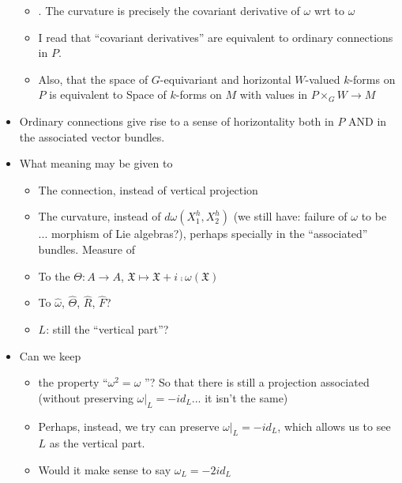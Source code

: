 \begin{itemize}
\begin{itemize}
        \item {}. The curvature is precisely the covariant derivative of $\omega$ wrt to $\omega$
        
        \item I read that ``covariant derivatives'' are equivalent to ordinary connections in $P$.
        
        \item Also, that the space of $G$-equivariant and horizontal $W$-valued $k$-forms on $P$ is equivalent to Space of $k$-forms on $M$ with values in $P\times_G W \to M$
    \end{itemize}
    
    
    \item Ordinary connections give rise to a sense of horizontality both in $P$ AND in the associated vector bundles.
    
    \item What meaning may be given to
    \begin{itemize}
        \item The connection, instead of vertical projection
        
        \item The curvature, instead of $d\omega(X_1^h, X_2^h)$ (we still have: failure of $\omega$ to be ... morphism of Lie algebras?), perhaps specially in the ``associated'' bundles. Measure of 
        
        \item To the $\Theta:A \to A$, $\mathfrak X \mapsto \mathfrak X + i \comp \omega(\mathfrak X)$ 
        
        \item To $\hat \omega$, $\hat \Theta$, $\hat R$, $\hat F$?
        
        \item $L$: still the ``vertical part''?
    \end{itemize}
    
    \item Can we keep
    \begin{itemize}
        \item the property ``$\omega^2 = \omega$ ''? So that there is still a projection associated (without preserving $\omega |_L = -id_L$... it isn't the same)
        
        \item Perhaps, instead, we try can preserve $\omega |_L = -id_L$, which allows us to see $L$ as the vertical part.
        
        \item Would it make sense to say $\omega_L = -2id_L$
    \end{itemize}
\end{itemize}

